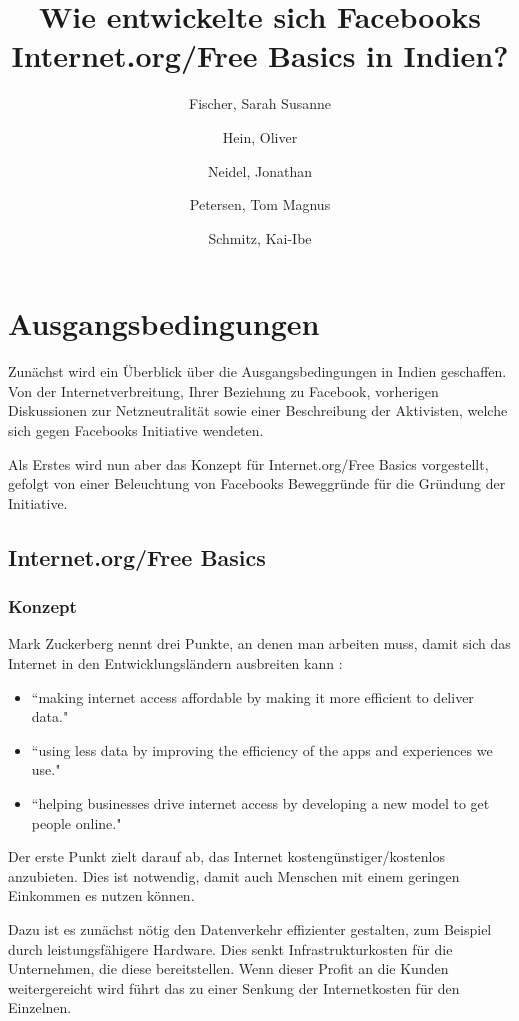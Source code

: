 \documentclass{article}
\title{Wie entwickelte sich Facebooks Internet.org/Free Basics in Indien?}
\author{
  Fischer, Sarah Susanne\\
  \and
  Hein, Oliver\\
  \and
  Neidel, Jonathan\\
  \and
  Petersen, Tom Magnus\\
  \and
  Schmitz, Kai-Ibe\\
}
\begin{document}
\maketitle

\section{Ausgangsbedingungen}

Zunächst wird ein Überblick über die Ausgangsbedingungen in Indien geschaffen. Von der Internetverbreitung, Ihrer Beziehung zu Facebook, vorherigen Diskussionen zur Netzneutralität sowie einer Beschreibung der Aktivisten, welche sich gegen Facebooks Initiative wendeten.

Als Erstes wird nun aber das Konzept für Internet.org/Free Basics vorgestellt, gefolgt von einer Beleuchtung von Facebooks Beweggründe für die Gründung der Initiative.

\subsection{Internet.org/Free Basics}

\subsubsection{Konzept}
        
Mark Zuckerberg nennt drei Punkte, an denen man arbeiten muss, damit sich das Internet in den Entwicklungsländern ausbreiten kann
\parencite{HumanRight}:

\begin{itemize}
\item ``making internet access affordable by making it more efficient to deliver data."
\item ``using less data by improving the efficiency of the apps and experiences we use."
\item ``helping businesses drive internet access by developing a new model to get people online."  
\end{itemize}

Der erste Punkt zielt darauf ab, das Internet kostengünstiger/kostenlos anzubieten. 
Dies ist notwendig, damit auch Menschen mit einem geringen Einkommen es nutzen können.

Dazu ist es zunächst nötig den Datenverkehr effizienter gestalten, zum Beispiel durch leistungsfähigere Hardware.
Dies senkt Infrastrukturkosten für die Unternehmen, die diese bereitstellen.
Wenn dieser Profit an die Kunden weitergereicht wird führt das zu einer Senkung der Internetkosten für den Einzelnen.
\end{document}
